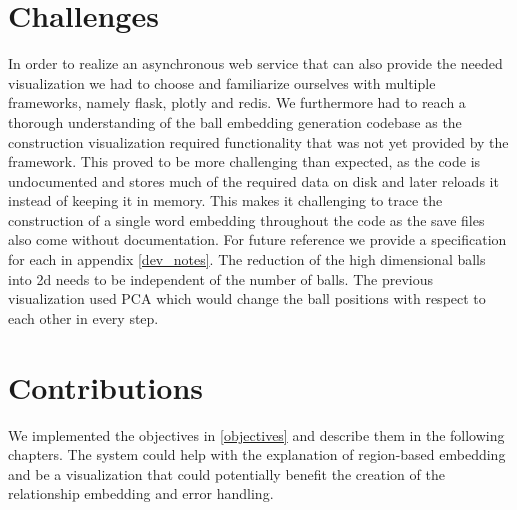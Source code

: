 \section{Challenges}
In order to realize an asynchronous web service that can also provide the needed visualization we had to choose and familiarize ourselves with multiple frameworks, namely flask, plotly and redis.
We furthermore had to reach a thorough understanding of the ball embedding generation codebase as the construction visualization required functionality that was not yet provided by the framework.
This proved to be more challenging than expected, as the code is undocumented and stores much of the required data on disk and later reloads it instead of keeping it in memory. This makes it challenging to trace the construction of a single word embedding throughout the code as the save files also come without documentation. For future reference we provide a specification for each in appendix \ref{dev_notes}.
The reduction of the high dimensional balls into 2d needs to be independent of the number of balls. The previous visualization used PCA which would change the ball positions with respect to each other in every step.

\section{Contributions}
We implemented the objectives in \ref{objectives} and describe them in the following chapters. The system could help with the explanation of region-based embedding and be a visualization that could potentially benefit the creation of the relationship embedding and error handling.